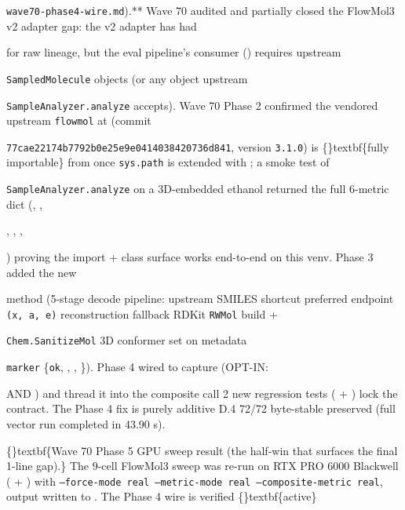 \documentclass{article}
\begin{document}
\texttt{wave70-phase4-wire.md}).** Wave 70 audited and partially closed the FlowMol3 v2 adapter gap: the v2 adapter has had

 for raw lineage, but the eval pipeline's  consumer () requires upstream

\texttt{SampledMolecule} objects (or any object upstream

\texttt{SampleAnalyzer.analyze} accepts). Wave 70 Phase 2 confirmed the vendored upstream \texttt{flowmol} at  (commit

\texttt{77cae22174b7792b0e25e9e0414038420736d841}, version \texttt{3.1.0}) is \{\}textbf\{fully importable\} from  once \texttt{sys.path} is extended with ; a smoke test of

\texttt{SampleAnalyzer.analyze} on a 3D-embedded ethanol returned the full 6-metric dict (, ,

, , ,

)  proving the import + class surface works end-to-end on this venv. Phase 3 added the new

 method (5-stage decode pipeline: upstream SMILES shortcut preferred  endpoint \texttt{(x, a, e)} reconstruction fallback  RDKit \texttt{RWMol} build +

\texttt{Chem.SanitizeMol}  3D conformer set on   metadata

\texttt{marker}  \{\texttt{ok}, , , \}). Phase 4 wired  to capture  (OPT-IN:

 AND ) and thread it into the composite call  2 new regression tests ( + ) lock the contract. The Phase 4 fix is purely additive  D.4 72/72 byte-stable preserved (full vector run completed in 43.90 s).

\{\}textbf\{Wave 70 Phase 5 GPU sweep result (the half-win that surfaces the final 1-line gap).\} The 9-cell FlowMol3 sweep was re-run on RTX PRO 6000 Blackwell ( + ) with \texttt{--force-mode real --metric-mode real --composite-metric real}, output written to . The Phase 4 wire is verified \{\}textbf\{active\} 
\end{document}
